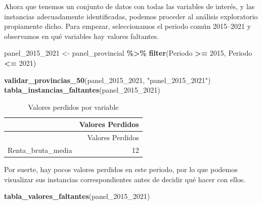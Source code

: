 \documentclass[,article,submit,moreauthors,pdftex]{Definitions/mdpi}
\newenvironment{Shaded}{\begin{snugshade}}{\end{snugshade}}
\newcommand{\DecValTok}[1]{\textcolor[rgb]{0.00,0.00,0.81}{#1}}
\newcommand{\FunctionTok}[1]{\textcolor[rgb]{0.13,0.29,0.53}{\textbf{#1}}}
\newcommand{\NormalTok}[1]{#1}
\newcommand{\OtherTok}[1]{\textcolor[rgb]{0.56,0.35,0.01}{#1}}
\newcommand{\SpecialCharTok}[1]{\textcolor[rgb]{0.81,0.36,0.00}{\textbf{#1}}}
\newcommand{\StringTok}[1]{\textcolor[rgb]{0.31,0.60,0.02}{#1}}
\begin{document}
Ahora que tenemos un conjunto de datos con todas las variables de
interés, y las instancias adecuadamente identificadas, podemos proceder
al análisis exploratorio propiamente dicho. Para empezar, seleccionamos
el periodo común 2015--2021 y observamos en qué variables hay valores
faltantes.

\begin{Shaded}
\begin{Highlighting}[]
\NormalTok{panel\_2015\_2021 }\OtherTok{\textless{}{-}}\NormalTok{ panel\_provincial }\SpecialCharTok{\%\textgreater{}\%}
  \FunctionTok{filter}\NormalTok{(Periodo }\SpecialCharTok{\textgreater{}=} \DecValTok{2015}\NormalTok{, Periodo }\SpecialCharTok{\textless{}=} \DecValTok{2021}\NormalTok{)}

\FunctionTok{validar\_provincias\_50}\NormalTok{(panel\_2015\_2021, }\StringTok{"panel\_2015\_2021"}\NormalTok{)}
\FunctionTok{tabla\_instancias\_faltantes}\NormalTok{(panel\_2015\_2021)}
\end{Highlighting}
\end{Shaded}

\begin{longtable}[]{@{}lr@{}}
\caption{Valores perdidos por variable}\tabularnewline
\toprule\noalign{}
& Valores Perdidos \\
\midrule\noalign{}
\endfirsthead
\toprule\noalign{}
& Valores Perdidos \\
\midrule\noalign{}
\endhead
\bottomrule\noalign{}
\endlastfoot
Renta\_bruta\_media & 12 \\
\end{longtable}

Por suerte, hay pocos valores perdidos en este periodo, por lo que
podemos visualizar sus instancias correspondientes antes de decidir qué
hacer con ellos.

\begin{Shaded}
\begin{Highlighting}[]
\FunctionTok{tabla\_valores\_faltantes}\NormalTok{(panel\_2015\_2021)}
\end{Highlighting}
\end{Shaded}
\end{document}
